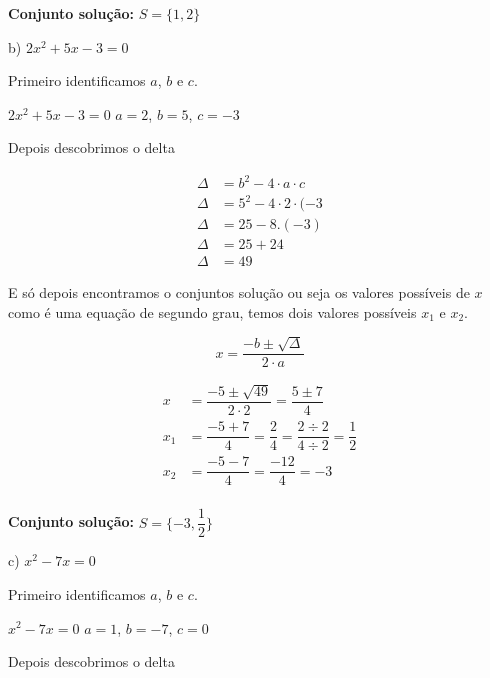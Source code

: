 \documentclass[letterpaper]{book}
\begin{document}
\begin{center}
\textbf{Conjunto solução:} \(S = \{1, 2\}\)
\end{center}

b) \(2x^{2} + 5x - 3 = 0\)

\vspace{0.5em}

Primeiro identificamos \(a\), \(b\) e \(c\).

\vspace{0.5em}

\(2x^{2} + 5x - 3 = 0\)
\(a = 2\), $b = 5$, $c = -3$

Depois descobrimos o delta

\begin{align*}
\Delta &= b^{2} - 4 \cdot a \cdot c\\
\Delta &= 5^{2} - 4 \cdot 2 \cdot (-3\\
\Delta &= 25 - 8 . (-3)\\
\Delta &= 25 + 24\\
\Delta &= 49
\end{align*}

E só depois encontramos o conjuntos solução ou seja os valores possíveis de \(x\) como é uma equação de segundo grau, temos dois valores possíveis $x_1$ e $x_2$.

\vspace{0.5em}

\[x = \dfrac{-b \pm \sqrt{\Delta}}{2 \cdot a}\]

\begin{align}
x &= \dfrac{-5 \pm \sqrt{49}}{2 \cdot 2} = \dfrac{5 \pm 7}{4}\\
x_1 &= \dfrac{-5 + 7}{4} = \dfrac{2}{4} = \dfrac{2 \div 2}{4 \div 2} = \dfrac{1}{2}\\
x_2 &= \dfrac{-5 - 7}{4} = \dfrac{-12}{4} = -3\\
\end{align}

\begin{center}
\textbf{Conjunto solução:} \(S = \{-3, \dfrac{1}{2}\}\)
\end{center}

c) \(x^{2} -7x = 0\)

\vspace{0.5em}

Primeiro identificamos \(a\), \(b\) e \(c\).

\(x^{2} -7x = 0\)
\(a = 1\), \(b = -7\), \(c = 0\)

Depois descobrimos o delta
\end{document}

